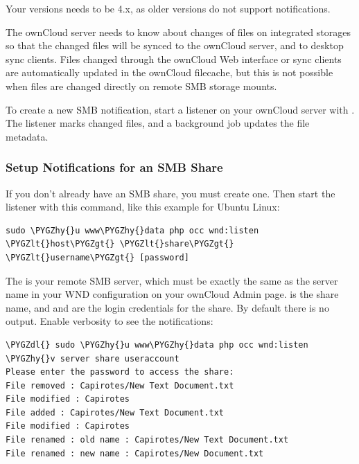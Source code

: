 \documentclass[letterpaper,10pt,english]{sphinxmanual}
\def\PYGZlt{\char`\<}
\def\PYGZgt{\char`\>}
\def\PYGZdl{\char`\$}
\def\PYGZhy{\char`\-}
\begin{document}
Your  versions needs to be 4.x, as older versions do not support notifications.

The ownCloud server needs to know about changes of files on integrated storages so that the changed files will be synced to the ownCloud server, and to desktop sync clients. Files changed through the ownCloud Web interface or sync clients are automatically updated in the ownCloud filecache, but this is not possible when files are changed directly on remote SMB storage mounts.

To create a new SMB notification, start a listener on your ownCloud server with . The listener marks changed files, and a background job updates the file metadata.


\subsubsection{Setup Notifications for an SMB Share}
\label{enterprise_external_storage/windows-network-drive_configuration:setup-notifications-for-an-smb-share}
If you don't already have an SMB share, you must create one. Then start the listener with this command, like this example for Ubuntu Linux:

\begin{Verbatim}[commandchars=\\\{\}]
sudo \PYGZhy{}u www\PYGZhy{}data php occ wnd:listen \PYGZlt{}host\PYGZgt{} \PYGZlt{}share\PYGZgt{} \PYGZlt{}username\PYGZgt{} [password]
\end{Verbatim}

The  is your remote SMB server, which must be exactly the same as the server name in your WND configuration on your ownCloud Admin page.  is the share name, and  and  are the login credentials for the share. By default there is no output. Enable verbosity to see the notifications:

\begin{Verbatim}[commandchars=\\\{\}]
\PYGZdl{} sudo \PYGZhy{}u www\PYGZhy{}data php occ wnd:listen \PYGZhy{}v server share useraccount
Please enter the password to access the share:
File removed : Capirotes/New Text Document.txt
File modified : Capirotes
File added : Capirotes/New Text Document.txt
File modified : Capirotes
File renamed : old name : Capirotes/New Text Document.txt
File renamed : new name : Capirotes/New Document.txt
\end{Verbatim}
\end{document}

